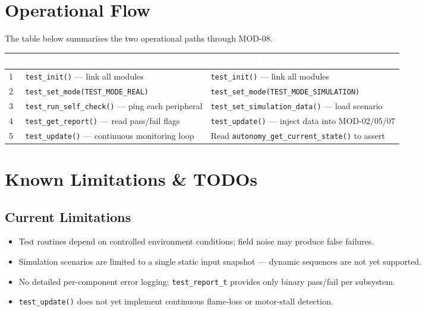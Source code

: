 \documentclass[a4paper,11pt]{article}
\newcommand{\theadtext}[1]{\textcolor{white}{\textbf{#1}}}
\begin{document}
\section{Operational Flow}

The table below summarises the two operational paths through MOD-08.

\vspace{6pt}
\begin{tabular}{C{0.5cm} L{7.99cm} L{7.99cm}}
\toprule
{}
\theadtext{\#} & \theadtext{Real Mode} & \theadtext{Simulation Mode} \\
\midrule
{}   1 & \texttt{test\_init()} --- link all modules                  & \texttt{test\_init()} --- link all modules \\
 2 & \texttt{test\_set\_mode(TEST\_MODE\_REAL)}                   & \texttt{test\_set\_mode(TEST\_MODE\_SIMULATION)} \\
   3 & \texttt{test\_run\_self\_check()} --- ping each peripheral   & \texttt{test\_set\_simulation\_data()} --- load scenario \\
 4 & \texttt{test\_get\_report()} --- read pass/fail flags        & \texttt{test\_update()} --- inject data into MOD-02/05/07 \\
   5 & \texttt{test\_update()} --- continuous monitoring loop       & Read \texttt{autonomy\_get\_current\_state()} to assert \\
\bottomrule
\end{tabular}

\section{Known Limitations \& TODOs}

\subsection{Current Limitations}

\begin{itemize}
  \item Test routines depend on controlled environment conditions; field noise may produce false failures.
  \item Simulation scenarios are limited to a single static input snapshot --- dynamic sequences are not yet supported.
  \item No detailed per-component error logging; \texttt{test\_report\_t} provides only binary pass/fail per subsystem.
  \item \texttt{test\_update()} does not yet implement continuous flame-loss or motor-stall detection.
\end{itemize}
\end{document}
